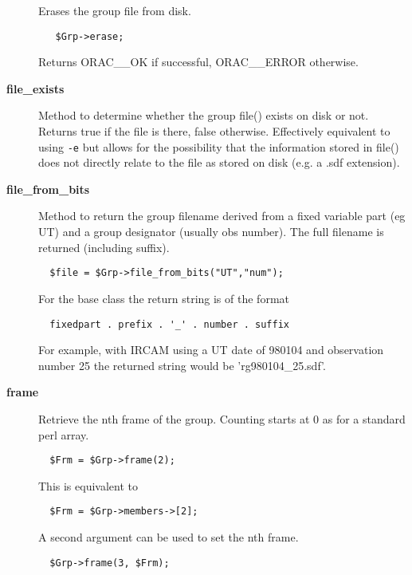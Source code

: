 \begin{description}
Erases the group file from disk.

\begin{verbatim}
   $Grp->erase;
\end{verbatim}


Returns ORAC\_\_OK if successful, ORAC\_\_ERROR otherwise.


\item[\textbf{file\_exists}] \mbox{}

Method to determine whether the group file() exists on disk or not.
Returns true if the file is there, false otherwise. Effectively
equivalent to using \texttt{-e} but allows for the possibility that the
information stored in file() does not directly relate to the
file as stored on disk (e.g. a .sdf extension).


\item[\textbf{file\_from\_bits}] \mbox{}

Method to return the group filename derived from a fixed
variable part (eg UT) and a group designator (usually obs
number). The full filename is returned (including suffix).

\begin{verbatim}
  $file = $Grp->file_from_bits("UT","num");
\end{verbatim}


For the base class the return string is of the format

\begin{verbatim}
  fixedpart . prefix . '_' . number . suffix
\end{verbatim}


For example, with IRCAM using a UT date of 980104 and observation
number 25 the returned string would be 'rg980104\_25.sdf'.


\item[\textbf{frame}] \mbox{}

Retrieve the nth frame of the group.
Counting starts at 0 as for a standard perl array.

\begin{verbatim}
  $Frm = $Grp->frame(2);
\end{verbatim}


This is equivalent to

\begin{verbatim}
  $Frm = $Grp->members->[2];
\end{verbatim}


A second argument can be used to set the nth frame.

\begin{verbatim}
  $Grp->frame(3, $Frm);
\end{verbatim}



\end{description}
